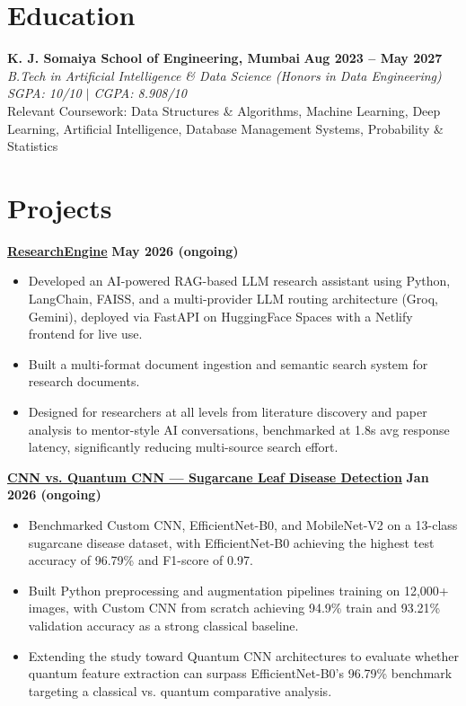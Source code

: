 \documentclass[9.5pt,letterpaper]{article}
\newcommand{\resumeItem}[1]{\item \small{#1}}
\newcommand{\resumeSubheading}[4]{
  \textbf{#1} \hfill \textbf{\small #2} \\[-1pt]
  \textit{\small#3} \hfill \textit{\small #4} \\[-2pt]
}
\newcommand{\resumeProject}[2]{
  \textbf{#1} \hfill \textbf{\small #2} \\[-1pt]
}
\begin{document}
\section{Education}

\resumeSubheading
{K. J. Somaiya School of Engineering, Mumbai}{Aug 2023 -- May 2027}
{B.Tech in Artificial Intelligence \& Data Science (Honors in Data Engineering)}{SGPA: 10/10 $|$ CGPA: 8.908/10}
\small{Relevant Coursework: Data Structures \& Algorithms, Machine Learning, Deep Learning, Artificial Intelligence, Database Management Systems, Probability \& Statistics}

\vspace{-5pt}
\section{Projects}

\resumeProject{\href{https://github.com/bhavika-bit/RE-SEARCH-ENGINE}{ResearchEngine}}{May 2026 (ongoing)}
\begin{itemize}
    \resumeItem{Developed an AI-powered RAG-based LLM research assistant using Python, LangChain, FAISS, and a multi-provider LLM routing architecture (Groq, Gemini), deployed via FastAPI on HuggingFace Spaces with a Netlify frontend for live use.}
\resumeItem{Built a multi-format document ingestion and semantic search system for research documents.}
\resumeItem{Designed for researchers at all levels from literature discovery and paper analysis to mentor-style AI conversations, benchmarked at 1.8s avg response latency, significantly reducing multi-source search effort.}
\end{itemize}

\resumeProject{\href{https://github.com/bhavika-bit/GROUP-22_CNN-VS.-QCNN-FOR-SUGARCANE-LEAF-DISEASE-DETECTION}{CNN vs. Quantum CNN --- Sugarcane Leaf Disease Detection}}{Jan 2026 (ongoing)}
\begin{itemize}
    \resumeItem{Benchmarked Custom CNN, EfficientNet-B0, and MobileNet-V2 on a 13-class sugarcane disease dataset, with EfficientNet-B0 achieving the highest test accuracy of 96.79\% and F1-score of 0.97.}
    \resumeItem{Built Python preprocessing and augmentation pipelines training on 12,000+ images, with Custom CNN from scratch achieving 94.9\% train and 93.21\% validation accuracy as a strong classical baseline.}
    \resumeItem{Extending the study toward Quantum CNN architectures to evaluate whether quantum feature extraction can surpass EfficientNet-B0's 96.79\% benchmark targeting a classical vs. quantum comparative analysis.}
\end{itemize}
\end{document}
